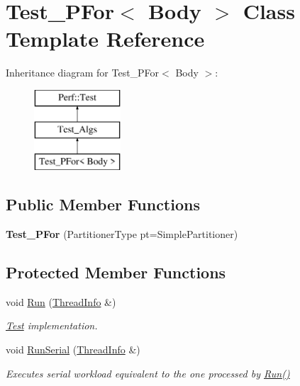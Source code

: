 \hypertarget{classTest__PFor}{}\section{Test\+\_\+\+P\+For$<$ Body $>$ Class Template Reference}
\label{classTest__PFor}
Inheritance diagram for Test\+\_\+\+P\+For$<$ Body $>$\+:\begin{figure}[H]
\begin{center}
\leavevmode
\includegraphics[height=3.000000cm]{classTest__PFor}
\end{center}
\end{figure}
\subsection*{Public Member Functions}
\begin{DoxyCompactItemize}
\item 
\hypertarget{classTest__PFor_aa75737390cd4795b965b5f2587130d80}{}{\bfseries Test\+\_\+\+P\+For} (Partitioner\+Type pt=Simple\+Partitioner)\label{classTest__PFor_aa75737390cd4795b965b5f2587130d80}

\end{DoxyCompactItemize}
\subsection*{Protected Member Functions}
\begin{DoxyCompactItemize}
\item 
void \hyperlink{classTest__PFor_a14d67cebd4bca82da7d103686392618d}{Run} (\hyperlink{structPerf_1_1Test_1_1ThreadInfo}{Thread\+Info} \&)
\begin{DoxyCompactList}\small\item\em \hyperlink{classTest}{Test} implementation. \end{DoxyCompactList}\item 
void \hyperlink{classTest__PFor_ace2d473bba6b5c78861bec4b3167d7b6}{Run\+Serial} (\hyperlink{structPerf_1_1Test_1_1ThreadInfo}{Thread\+Info} \&)
\begin{DoxyCompactList}\small\item\em Executes serial workload equivalent to the one processed by \hyperlink{classTest__PFor_a14d67cebd4bca82da7d103686392618d}{Run()} \end{DoxyCompactList}\end{DoxyCompactItemize}
